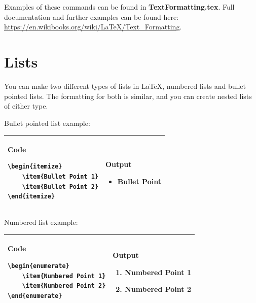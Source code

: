 \documentclass[10pt, titlepage]{article}
\begin{document}
Examples of these commands can be found in \textbf{TextFormatting.tex}. Full documentation and further examples can be found here: \url{https://en.wikibooks.org/wiki/LaTeX/Text_Formatting}.

\section{Lists}
You can make two different types of lists in LaTeX, numbered lists and bullet pointed lists. The formatting for both is similar, and you can create nested lists of either type.

Bullet pointed list example:\\
\begin{tabular}{|p{240pt}|p{240pt}|}\hline
\textbf{Code}\newline
\begin{lstlisting}
\begin{itemize}
	\item{Bullet Point 1}
	\item{Bullet Point 2}
\end{itemize}
\end{lstlisting} &
\textbf{Output}\newline
\begin{itemize}
	\item{Bullet Point}
\end{itemize} \\\hline
\end{tabular}

Numbered list example:\\
\begin{tabular}{|p{240pt}|p{240pt}|}\hline
\textbf{Code}\newline
\begin{lstlisting}
\begin{enumerate}
	\item{Numbered Point 1}
	\item{Numbered Point 2}
\end{enumerate}
\end{lstlisting} &
\textbf{Output}\newline
\begin{enumerate}
	\item{Numbered Point 1}
	\item{Numbered Point 2}
\end{enumerate} \\\hline
\end{tabular}
\end{document}
